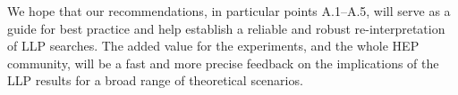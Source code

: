We hope that our recommendations, in particular points A.1--A.5, will serve as a
guide for best practice and help establish a reliable and robust re-interpretation of LLP searches.   
The added value for the experiments, and the whole HEP community, will be a fast 
and more precise feedback on the implications of the LLP results for a broad range of
theoretical scenarios.  


% 
% 
% 
% 

